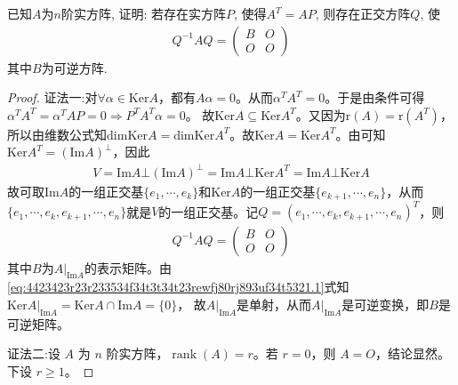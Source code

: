 \documentclass[../../main.tex]{subfiles}%
\begin{document}
\begin{example}
已知$A$为$n$阶实方阵, 证明: 若存在实方阵$P$, 使得$A^{T} = AP$, 则存在正交方阵$Q$, 使\begin{align*}Q^{-1}AQ = \begin{pmatrix} B & O \\ O & O \end{pmatrix}\end{align*}其中$B$为可逆方阵.
\end{example}
\begin{proof}
    
{\color{blue}证法一:}对$\forall \alpha \in \mathrm{Ker}A$，都有$A\alpha =0$。从而$\alpha ^TA^T=0$。于是由条件可得
$\alpha ^TA^T=\alpha ^TAP=0\Longrightarrow P^TA^T\alpha =0$。
故$\mathrm{Ker}A\subseteq \mathrm{Ker}A^T$。又因为$\mathrm{r}(A) =\mathrm{r}(A^T)$，所以由维数公式知$\mathrm{dimKer}A=\mathrm{dimKer}A^T$。故$\mathrm{Ker}A=\mathrm{Ker}A^T$。由可知$\mathrm{Ker}A^T=\left( \mathrm{Im}A \right) ^{\bot}$，因此
\begin{align}\label{eq:4423423r23r233534f34t3t34t23rewfj80rj893uf34t5321.1}
V=\mathrm{Im}A\bot \left( \mathrm{Im}A \right) ^{\bot}=\mathrm{Im}A\bot \mathrm{Ker}A^T=\mathrm{Im}A\bot \mathrm{Ker}A
\end{align}
故可取$\mathrm{Im}A$的一组正交基$\{ e_1,\cdots ,e_k \}$和$\mathrm{Ker}A$的一组正交基$\{ e_{k+1},\cdots ,e_n \}$，从而
$\{ e_1,\cdots ,e_k,e_{k+1},\cdots ,e_n \}$就是$V$的一组正交基。记$Q=\left( e_1,\cdots ,e_k,e_{k+1},\cdots ,e_n \right) ^T$，则
\begin{align*}
Q^{-1}AQ=\begin{pmatrix}
B&		O\\
O&		O
\end{pmatrix}
\end{align*}
其中$B$为$A|_{\mathrm{Im}A}$的表示矩阵。由\eqref{eq:4423423r23r233534f34t3t34t23rewfj80rj893uf34t5321.1}式知
$\mathrm{Ker}A|_{\mathrm{Im}A}=\mathrm{Ker}A\cap \mathrm{Im}A=\{ 0 \}$，
故$A|_{\mathrm{Im}A}$是单射，从而$A|_{\mathrm{Im}A}$是可逆变换，即$B$是可逆矩阵。

{\color{blue}证法二:}设 $A$ 为 $n$ 阶实方阵，$\operatorname{rank}(A)=r$。若 $r=0$，则 $A=O$，结论显然。下设 $r\geqslant 1$。


\end{proof}
\end{document}
